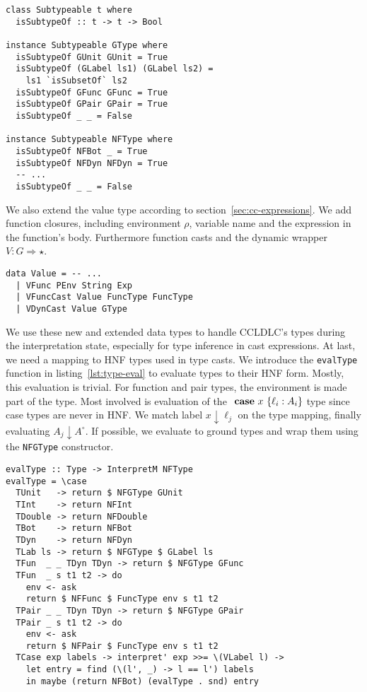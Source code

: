 \begin{lstlisting}[float,
  label=lst:subtypeable,
  caption=Subtypeable typeclass (\texttt{ProcessEnvironment.hs})]
class Subtypeable t where
  isSubtypeOf :: t -> t -> Bool

instance Subtypeable GType where
  isSubtypeOf GUnit GUnit = True
  isSubtypeOf (GLabel ls1) (GLabel ls2) =
    ls1 `isSubsetOf` ls2
  isSubtypeOf GFunc GFunc = True
  isSubtypeOf GPair GPair = True
  isSubtypeOf _ _ = False

instance Subtypeable NFType where
  isSubtypeOf NFBot _ = True
  isSubtypeOf NFDyn NFDyn = True
  -- ...
  isSubtypeOf _ _ = False
\end{lstlisting}

We also extend the value type according to section~\ref{sec:cc-expressions}. We add function closures, including environment $\rho$, variable name and the expression in the function's body. Furthermore function casts and the dynamic wrapper $V : G \Rightarrow \star$.

\begin{lstlisting}[caption=Value type extensions (\texttt{ProcessEnvironment.hs})]
data Value = -- ...
  | VFunc PEnv String Exp
  | VFuncCast Value FuncType FuncType
  | VDynCast Value GType
\end{lstlisting}

We use these new and extended data types to handle CCLDLC's types during the interpretation state, especially for type inference in cast expressions. At last, we need a mapping to HNF types used in type casts. We introduce the \texttt{evalType} function in listing~\ref{lst:type-eval} to evaluate types to their HNF form. Mostly, this evaluation is trivial. For function and pair types, the environment is made part of the type. Most involved is evaluation of the $\text{ \textbf{case} } x~\{\ell_i : A_i\}$ type since case types are never in HNF. We match label $x \downarrow \ell_j$ on the type mapping, finally evaluating $A_j \downarrow A^\circ$. If possible, we evaluate to ground types and wrap them using the \texttt{NFGType} constructor.

\begin{lstlisting}[float,
  caption=Type evaluation (\texttt{Interpreter.hs}),
  label=lst:type-eval]
evalType :: Type -> InterpretM NFType
evalType = \case
  TUnit   -> return $ NFGType GUnit
  TInt    -> return NFInt
  TDouble -> return NFDouble
  TBot    -> return NFBot
  TDyn    -> return NFDyn
  TLab ls -> return $ NFGType $ GLabel ls
  TFun  _ _ TDyn TDyn -> return $ NFGType GFunc
  TFun  _ s t1 t2 -> do
    env <- ask
    return $ NFFunc $ FuncType env s t1 t2
  TPair _ _ TDyn TDyn -> return $ NFGType GPair
  TPair _ s t1 t2 -> do
    env <- ask
    return $ NFPair $ FuncType env s t1 t2
  TCase exp labels -> interpret' exp >>= \(VLabel l) ->
    let entry = find (\(l', _) -> l == l') labels
    in maybe (return NFBot) (evalType . snd) entry
\end{lstlisting}

